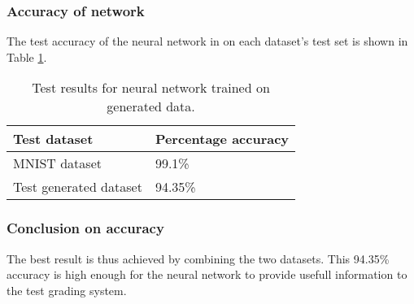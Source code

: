 \subsubsection{Accuracy of network}

The test accuracy of the neural network in on each dataset's test set is shown in Table \ref{tbl:nnResult3}.

\begin{table}
\caption{Test results for neural network trained on generated data.} \label{tbl:nnResult3}
  \centering
\begin{tabular}{|p{4cm}|p{5cm}|}
\hline
\textbf{Test dataset}&\textbf{Percentage accuracy}\\
\hline
MNIST dataset&99.1\%\\
\hline
Test generated dataset&94.35\%\\
\hline
\end{tabular}
\end{table}

\subsubsection{Conclusion on accuracy}

The best result is thus achieved by combining the two datasets. This 94.35\% accuracy is high enough for the neural network to provide usefull information to the test grading system.